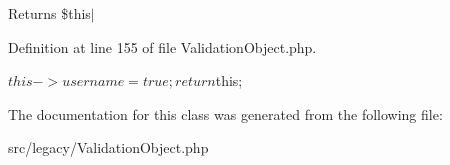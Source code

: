\begin{DoxyReturn}{\-Returns}
\$this$|$ 
\end{DoxyReturn}


\-Definition at line 155 of file \-Validation\-Object.\-php.


\begin{DoxyCode}
    {
        $this->username = true;

        return $this;
    }
\end{DoxyCode}


\-The documentation for this class was generated from the following file\-:\begin{DoxyCompactItemize}
\item 
src/legacy/\-Validation\-Object.\-php\end{DoxyCompactItemize}
